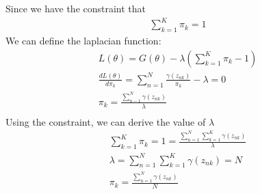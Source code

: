 \documentclass[12pt,twoside]{article}
\begin{document}
Since we have the constraint that
\begin{align}
\sum_{k=1}^K \pi_k = 1
\end{align}
We can define the laplacian function:
\begin{align}
L(\theta) = G(\theta) - \lambda (\sum_{k=1}^K \pi_k - 1) \\
\frac{d L(\theta)}{d \pi_k} = \sum_{n=1}^N \frac{\gamma(z_{nk})}{\pi_k} - \lambda = 0\\
\pi_k = \frac{\sum_{n-1}^N \gamma(z_{nk})}{\lambda}\\
\end{align}
Using the constraint, we can derive the value of $\lambda$
\begin{align}
\sum_{k=1}^K \pi_k = 1 = \frac{\sum_{n=1}^{N} \sum_{k=1}^{K} \gamma(z_{nk}) }{\lambda}\\
\lambda = \sum_{n=1}^{N} \sum_{k=1}^{K} \gamma(z_{nk}) = N\\
\pi_k = \frac{\sum_{n=1}^{N} \gamma(z_{nk})}{N}
\end{align}
\end{document}
